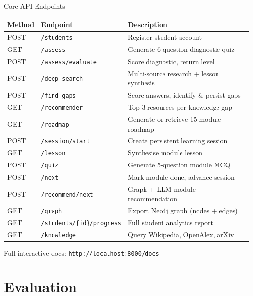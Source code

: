 \documentclass[aspectratio=169,9pt]{beamer}
\begin{document}
\begin{frame}{Core API Endpoints}
\small
\begin{tabularx}{\textwidth}{@{}llX@{}}
  \toprule
  \textbf{Method} & \textbf{Endpoint} & \textbf{Description} \\
  \midrule
  POST & \texttt{/students}                & Register student account \\
  GET  & \texttt{/assess}                  & Generate 6-question diagnostic quiz \\
  POST & \texttt{/assess/evaluate}         & Score diagnostic, return level \\
  POST & \texttt{/deep-search}             & Multi-source research + lesson synthesis \\
  POST & \texttt{/find-gaps}               & Score answers, identify \& persist gaps \\
  GET  & \texttt{/recommender}             & Top-3 resources per knowledge gap \\
  GET  & \texttt{/roadmap}                 & Generate or retrieve 15-module roadmap \\
  POST & \texttt{/session/start}           & Create persistent learning session \\
  GET  & \texttt{/lesson}                  & Synthesise module lesson \\
  POST & \texttt{/quiz}                    & Generate 5-question module MCQ \\
  POST & \texttt{/next}                    & Mark module done, advance session \\
  POST & \texttt{/recommend/next}          & Graph + LLM module recommendation \\
  GET  & \texttt{/graph}                   & Export Neo4j graph (nodes + edges) \\
  GET  & \texttt{/students/\{id\}/progress} & Full student analytics report \\
  GET  & \texttt{/knowledge}               & Query Wikipedia, OpenAlex, arXiv \\
  \bottomrule
\end{tabularx}

\vspace{0.2cm}
\textcolor{mygray}{\small Full interactive docs: \texttt{http://localhost:8000/docs}}
\end{frame}

\section{Evaluation}
\end{document}

